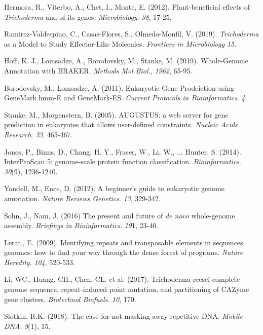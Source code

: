 \documentclass[12pt]{article}
\begin{document}
\begin{thebibliography}{99}
 Hermosa, R., Viterbo, A., Chet, I., Monte,
  E. (2012). Plant-beneficial effects of \textit{Trichoderma} and of
  its genes. \textit{Microbiology}. \textit{38},
  17-25. 

 Ramirez-Valdespino, C., Casas-Flores, S.,
  Olmedo-Monfil, V. (2019). \textit{Trichoderma} as a Model to Study
  Effector-Like Molecules. \textit{Frontiers in Microbiology} \textit{15}.

 Hoff, K. J., Lomsadze, A., Borodovsky, M., 
  Stanke, M. (2019). Whole-Genome Annotation with
  BRAKER. \textit{Methods Mol Biol.}, \textit{1962}, 65-95.

 Borodovsky, M., Lomsadze, A. (2011). Eukaryotic
  Gene Prodeiction using GeneMark.hmm-E and
  GeneMark-ES. \textit{Current Protocols in
    Bioinformatics}. \textit{4}.

 Stanke, M., Morgenstern, B. (2005). AUGUSTUS: a web
  server for gene prediction in eukaryotes that allows user-defined
  constraints. \textit{Nucleic Acids Research}. \textit{33}, 465-467.
  
 Jones, P., Binns, D., Chang, H. Y., Fraser,
  W., Li, W., ... Hunter, S. (2014). InterProScan 5: genome-scale
  protein function
  classification. \textit{Bioinformatics}. \textit{30}(9),
  1236-1240.

 Yandell, M., Ence, D. (2012). A beginner's
  guide to eukaryotic genome annotation. \textit{Nature Reviews
    Genetics}. \textit{13}, 329-342.
  
 Sohn, J., Nam, J. (2016) The present and future of
  \textit{de novo} whole-genome assembly. \textit{Briefings in
    Bioinformatics}. \textit{19}1, 23-40.

 Lerat., E. (2009). Identifying repeats and
  transposable elements in sequences genomes: how to find your way
  through the dense forest of programs. \textit{Nature
    Heredity}. \textit{104}, 520-533.

 Li, WC., Huang, CH., Chen, CL. et
  al. (2017). Trichoderma reesei complete genome sequence,
  repeat-induced point mutation, and partitioning of CAZyme gene
  clusters. \textit{Biotechnol Biofuels}. \textit{10}, 170.

 Slotkin, R.K. (2018). The case for not masking away
  repetitive DNA. \textit{Mobile DNA}. \textit{9}(1), 15.
  

\end{thebibliography}
\end{document}
